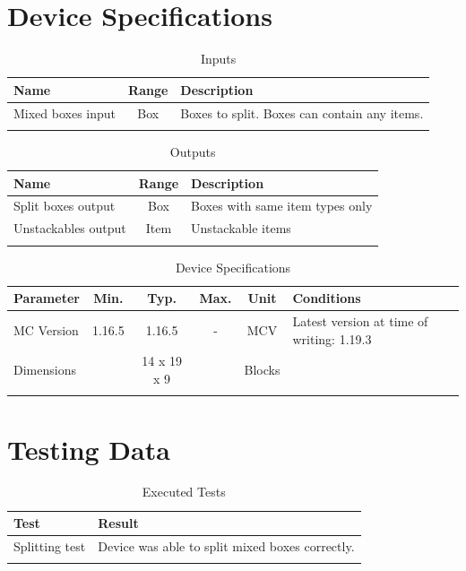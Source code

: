 \documentclass[10pt]{datasheet}
\begin{document}
\onecolumn

\section{Device Specifications}

\begin{table}[h]
    \caption{Inputs}
    \begin{tabularx}{\textwidth}{l | c | X}
        \thickhline
        \textbf{Name} & \textbf{Range} & \textbf{Description} \\
        \hline
        Mixed boxes input & Box & Boxes to split. Boxes can contain any items. \\
        \thickhline
\end{tabularx}
\end{table}

\begin{table}[h]
    \caption{Outputs}
    \begin{tabularx}{\textwidth}{l | c | X}
        \thickhline
        \textbf{Name} & \textbf{Range} & \textbf{Description} \\
        \hline
        Split boxes output & Box & Boxes with same item types only \\
        \hline
        Unstackables output & Item & Unstackable items \\
        \thickhline
\end{tabularx}
\end{table}

\begin{table}[h]
    \caption{Device Specifications}
    \begin{tabularx}{\textwidth}{l | c c c | c | X}
        \thickhline
        \textbf{Parameter} & \textbf{Min.} & \textbf{Typ.} & \textbf{Max.} &
        \textbf{Unit} & \textbf{Conditions} \\
        \hline
        MC Version & 1.16.5 & 1.16.5 & - & MCV & Latest version at time of writing: 1.19.3\\
        \hline
        Dimensions & & 14 x 19 x 9 & & Blocks & \\
        \thickhline
\end{tabularx}
\end{table}
\newpage
\section{Testing Data}
\begin{table}[h]
\caption{Executed Tests}
\begin{tabularx}{\textwidth}{l | X}
    \thickhline
    \textbf{Test} & \textbf{Result} \\
    \hline
    Splitting test & Device was able to split mixed boxes correctly. \\
    \thickhline
\end{tabularx}
\end{table}
\end{document}
